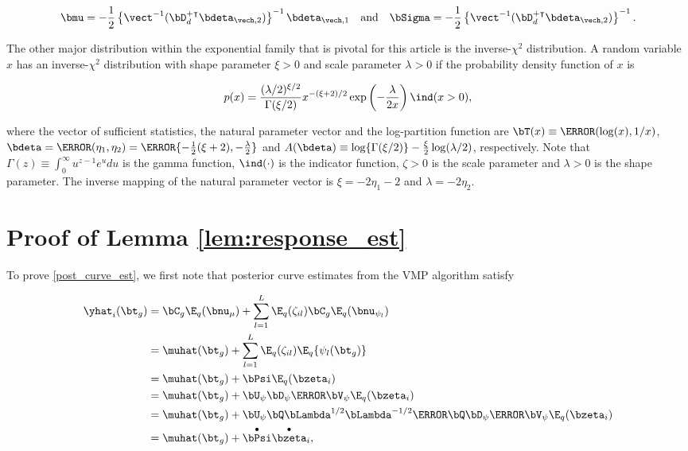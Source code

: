 \documentclass[12pt]{article}
\theoremstyle{plain}
\theoremstyle{definition}
\theoremstyle{remark}
\def\numu{\bnu_\mu}
\newcommand\nupsi[1]{\bnu_{\psi_{#1}}}
\begin{document}
\begin{equation}
	\bmu = -\frac12 \left\{ \vect^{-1} (\bD_d^{+ \intercal}\bdeta_{\vech, 2}) \right\}^{-1} \bdeta_{\vech, 1} \quad
	\text{and} \quad
	\bSigma = -\frac12 \left\{ \vect^{-1} (\bD_d^{+ \intercal}\bdeta_{\vech, 2}) \right\}^{-1}.
\label{gauss_vech_comm_params}
\end{equation}

The other major distribution within the exponential family that is pivotal for this article is the inverse-$\chi^2$ distribution.
A random variable $x$ has an inverse-$\chi^2$ distribution with shape parameter $\xi > 0$ and scale parameter
$\lambda > 0$ if the probability density function of $x$ is

\[
	p(x) = 
		\frac{(\lambda/2)^{\xi/2}}{\Gamma (\xi/2)}
		x^{-(\xi + 2)/2} \exp \left( -\frac{\lambda}{2 x} \right) \ind (x > 0),
\]

\noindent where the vector of sufficient statistics, the natural parameter vector and the log-partition function are
$\bT (x) \equiv \T{( \log (x), 1/x )}$, $\bdeta = \T{(\eta_1, \eta_2)} = \T{\{-\frac12 (\xi + 2), -\frac{\lambda}{2} \}}$
and $A(\bdeta) \equiv \log \{ \Gamma (\xi/2) \} - \frac{\xi}{2} \log (\lambda/2)$, respectively. Note that
$\Gamma (z) \equiv \int_0^\infty u^{z - 1} e^u du$ is the gamma function,
$\ind (\cdot)$ is the indicator function, $\zeta > 0$ is the scale parameter and $\lambda > 0$ is the shape parameter.
The inverse mapping of the natural parameter vector is
$\xi = -2 \eta_1 - 2$ and $\lambda = -2 \eta_2$.


\section{Proof of Lemma \ref{lem:response_est}}
\label{app:proof_lem_response_est}

To prove \eqref{post_curve_est}, we first note that posterior curve estimates from the VMP algorithm satisfy

\begin{align}
\begin{split}
	\yhat_i (\bt_g)
		&= \bC_g \E_q (\numu) + \sum_{l=1}^L \E_q (\zeta_{il}) \bC_g \E_q (\nupsi{l}) \\
		&= \muhat (\bt_g) + \sum_{l=1}^L \E_q (\zeta_{il}) \E_q \{ \psi_l (\bt_g) \} \\
		&= \muhat (\bt_g) + \bPsi \E_q (\bzeta_i) \\
		&= \muhat (\bt_g) + \bU_\psi \bD_\psi \T{\bV_\psi} \E_q (\bzeta_i) \\
		&= \muhat (\bt_g) + \bU_\psi \bQ \bLambda^{1/2} \bLambda^{-1/2} \T{\bQ} \bD_\psi \T{\bV_\psi} \E_q (\bzeta_i) \\
		&= \muhat (\bt_g) + \overset{\bullet}{\bPsi} \overset{\bullet}{\bzeta}_i,
\end{split}
\label{E_q_y}
\end{align}
\end{document}

